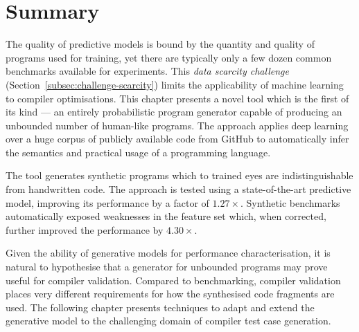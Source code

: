 \section{Summary}%
\label{sec:clgen-conclusion}

The quality of predictive models is bound by the quantity and quality of programs used for training, yet there are typically only a few dozen common benchmarks available for experiments. This \emph{data scarcity challenge} (Section~\ref{subsec:challenge-scarcity}) limits the applicability of machine learning to compiler optimisations. This chapter presents a novel tool which is the first of its kind --- an entirely probabilistic program generator capable of producing an unbounded number of human-like programs. The approach applies deep learning over a huge corpus of publicly available code from GitHub to automatically infer the semantics and practical usage of a programming language. 

The tool generates synthetic programs which to trained eyes are indistinguishable from handwritten code. The approach is tested using a state-of-the-art predictive model, improving its performance by a factor of $1.27\times$. Synthetic benchmarks automatically exposed weaknesses in the feature set which, when corrected, further improved the performance by $4.30\times$.

\newpage
Given the ability of generative models for performance characterisation, it is natural to hypothesise that a generator for unbounded programs may prove useful for compiler validation. Compared to benchmarking, compiler validation places very different requirements for how the synthesised code fragments are used. The following chapter presents techniques to adapt and extend the generative model to the challenging domain of compiler test case generation.